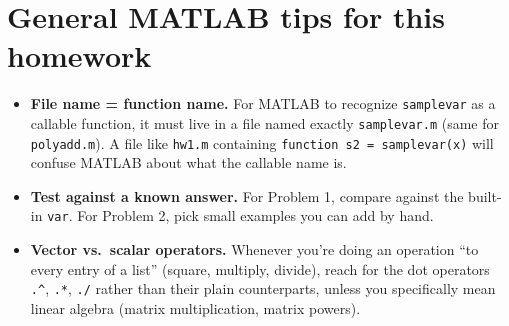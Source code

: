 \documentclass[11pt]{article}
\begin{document}
\section*{General MATLAB tips for this homework}
\begin{itemize}
  \item \textbf{File name = function name.} For MATLAB to recognize
        \texttt{samplevar} as a callable function, it must live in a
        file named exactly \texttt{samplevar.m} (same for
        \texttt{polyadd.m}). A file like \texttt{hw1.m} containing
        \texttt{function s2 = samplevar(x)} will confuse MATLAB about
        what the callable name is.
  \item \textbf{Test against a known answer.} For Problem 1, compare
        against the built-in \texttt{var}. For Problem 2, pick small
        examples you can add by hand.
  \item \textbf{Vector vs.\ scalar operators.} Whenever you're doing
        an operation ``to every entry of a list'' (square, multiply,
        divide), reach for the dot operators \texttt{.\string^},
        \texttt{.*}, \texttt{./} rather than their plain counterparts,
        unless you specifically mean linear algebra (matrix
        multiplication, matrix powers).
\end{itemize}
\end{document}
